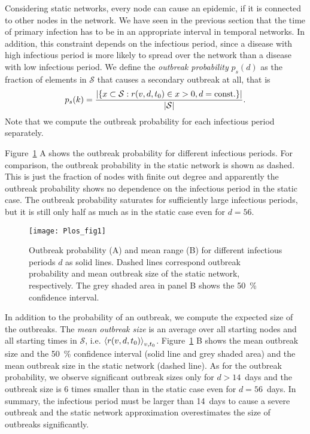 Considering static networks, every node can cause an epidemic, if it is connected to other nodes in the network.
We have seen in the previous section that the time of primary infection has to be in an appropriate interval in temporal networks.
In addition, this constraint depends on the infectious period, since a disease with high infectious period is more likely to spread over the network than a disease with low infectious period.
We define the \emph{outbreak probability} $p_s(d)$ as the fraction of elements in $\mathcal{S}$ that causes a secondary outbreak at all, that is
\begin{equation}\label{eq:outbreak_prob}
p_s(k)=\frac{\left| \left\{ x \subset \mathcal{S}: r(v,d,t_0) \in x >0, d=\mathrm{const.} \right\} \right|}{\left| \mathcal{S} \right|} .
\end{equation}
Note that we compute the outbreak probability for each infectious period separately.

Figure~\ref{fig:plosfig1} A shows the outbreak probability for different infectious periods.
For comparison, the outbreak probability in the static network is shown as dashed.
This is just the fraction of nodes with finite out degree and apparently the outbreak probability shows no dependence on the infectious period in the static case.
The outbreak probability saturates for sufficiently large infectious periods, but it is still only half as much as in the static case even for $d=56$.
%
\begin{figure}[htbp]
\begin{center}
\texttt{[image: Plos\_fig1]}
\caption{Outbreak probability (A) and mean range (B) for different infectious periods $d$ as solid lines.
Dashed lines correspond outbreak probability and mean outbreak size of the static network, respectively.
The grey shaded area in panel B shows the 50~\% confidence interval.}
\label{fig:plosfig1}
\end{center}
\end{figure}

In addition to the probability of an outbreak, we compute the expected size of the outbreaks.
The \emph{mean outbreak size} is an average over all starting nodes and all starting times in $\mathcal{S}$, i.e. $\left< r(v,d,t_0) \right>_{v,t_0}$.
Figure~\ref{fig:plosfig1} B shows the mean outbreak size and the 50~\% confidence interval (solid line and grey shaded area) and the mean outbreak size in the static network (dashed line).
As for the outbreak probability, we observe significant outbreak sizes only for $d>14$~days and the outbreak size is 6 times smaller than in the static case even for $d=56$~days.
In summary, the infectious period must be larger than 14~days to cause a severe outbreak and the static network approximation overestimates the size of outbreaks significantly.

